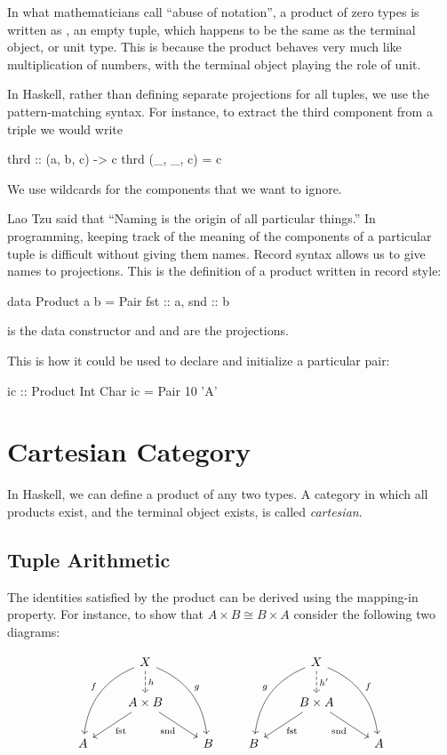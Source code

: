 \documentclass[DaoFP]{subfiles}
\begin{document}
In what mathematicians call ``abuse of notation'', a product of zero types is written as \hask{()}, an empty tuple, which happens to be the same as the terminal object, or unit type. This is because the product behaves very much like multiplication of numbers, with the terminal object playing the role of unit.

In Haskell, rather than defining separate projections for all tuples, we use the pattern-matching syntax. For instance, to extract the third component from a triple we would write

\begin{haskell}
thrd :: (a, b, c) -> c
thrd (_, _, c) = c
\end{haskell}
We use wildcards for the components that we want to ignore.

Lao Tzu said that ``Naming is the origin of all particular things.'' In programming, keeping track of the meaning of the components of a particular tuple is difficult without giving them names. Record syntax allows us to give names to projections. This is the definition of a product written in record style:
\begin{haskell}
data Product a b = Pair { fst :: a, snd :: b }
\end{haskell}
 is the data constructor and  and  are the projections. 

This is how it could be used to declare and initialize a particular pair:
\begin{haskell}
ic :: Product Int Char
ic = Pair 10 'A'
\end{haskell}

\section{Cartesian Category}

In Haskell, we can define a product of any two types. A category in which all products exist, and the terminal object exists, is called \emph{cartesian}. 

\subsection{Tuple Arithmetic}

The identities satisfied by the product can be derived using the mapping-in property. For instance, to show that $A \times B \cong B \times A$ consider the following two diagrams:

\[
 \begin{tikzcd}
 &X
 \arrow[d, dashed, "h"]
 \arrow[ddl, bend right, "f"']
 \arrow[ddr, bend left, "g"]
 \\
 & A \times B
  \arrow[dl,  "\text{fst}"]
 \arrow[dr,   "\text{snd}"']
 \\
A && B
 \end{tikzcd}
 \qquad
 \begin{tikzcd}
 &X
 \arrow[d, dashed, "h'"]
 \arrow[ddl, bend right, "g"']
 \arrow[ddr, bend left, "f"]
 \\
 & B \times A
  \arrow[dl,  "\text{fst}"]
 \arrow[dr,   "\text{snd}"']
\\
B && A
  \end{tikzcd}
\]
\end{document}
